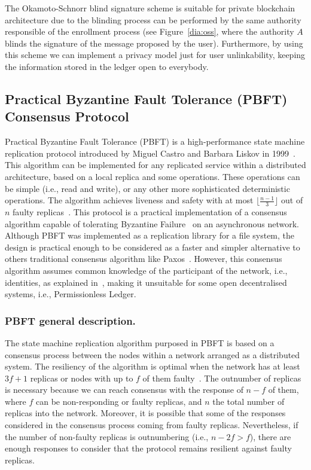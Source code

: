 \documentclass[conference]{IEEEtran}
\begin{document}
The Okamoto-Schnorr blind signature scheme is suitable for private blockchain architecture due to the blinding process can be performed by the same authority responsible of the enrollment process (see Figure~\ref{dia:oss}, where the authority $A$ blinds the signature of the message proposed by the user). Furthermore, by using this scheme we can implement a privacy model just for user unlinkability, keeping the information stored in the ledger open to everybody.

\subsection{Practical Byzantine Fault Tolerance (PBFT) Consensus Protocol}
\label{PBFT}
Practical Byzantine Fault Tolerance (PBFT) is a high-performance state machine replication protocol introduced by Miguel Castro and Barbara Liskov in 1999~\cite{castro1999practical}. This algorithm can be implemented for any replicated service within a distributed architecture, based on a local replica and some operations. These operations can be simple (i.e., read and write), or any other more sophisticated deterministic operations. The algorithm achieves liveness and safety with at most $\lfloor \frac{n-1}{3} \rfloor$ out of $n$ faulty replicas~\cite{castro1999practical}. This protocol is a practical implementation of a consensus algorithm capable of tolerating Byzantine Failure~\cite{lamport1982byzantine} on an asynchronous network. Although PBFT was implemented as a replication library for a file system, the design is practical enough to be considered as a faster and simpler alternative to others traditional consensus algorithm like Paxos~\cite{martin2006fast}. However, this consensus algorithm assumes common knowledge of the participant of the network, i.e., identities, as explained in~\cite{pass2017analysis}, making it unsuitable for some open decentralised systems, i.e., Permissionless Ledger.

\subsubsection{PBFT general description.}
The state machine replication algorithm purposed in PBFT is based on a consensus process between the nodes within a network arranged as a distributed system. The resiliency of the algorithm is optimal when the network has at least $3f+1$ replicas or nodes with up to $f$ of them faulty~\cite{bracha1985asynchronous}. The outnumber of replicas is necessary because we can reach consensus with the response of $n-f$ of them, where $f$ can be non-responding or faulty replicas, and $n$ the total number of replicas into the network. Moreover, it is possible that some of the responses considered in the consensus process coming from faulty replicas. Nevertheless, if the number of non-faulty replicas is outnumbering (i.e., $n-2f > f$), there are enough responses to consider that the protocol remains resilient against faulty replicas.
\end{document}
